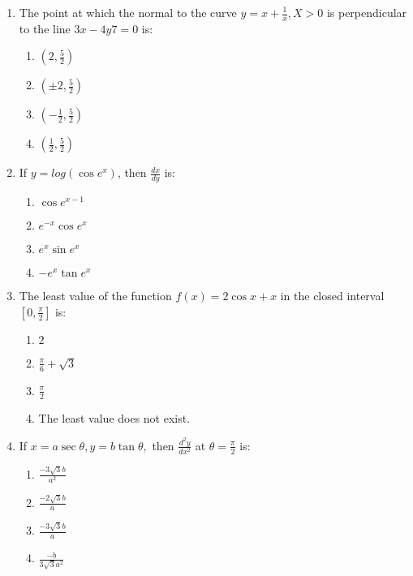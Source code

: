 \begin{enumerate}

\item The point at which the normal to the curve $ y = x + \frac{1}{x}, X > 0$ is perpendicular to the line $3x - 4y 7 = 0$ is:
	\begin{enumerate}
	\item $(2, \frac{5}{2})$
	\item $(\pm2, \frac{5}{2})$
      	\item $(-\frac{1}{2}, \frac{5}{2})$
      	\item $(\frac{1}{2}, \frac{5}{2})$
  	\end{enumerate}

\item If $y = log(\cos e^x)$, then $\frac{dx}{dy}$ is: 
   
	\begin{enumerate}
	\item $ \cos e^{x-1} $
	\item $ e^{-x} \cos e^x $
      	\item $ e^x \sin e^x $
      	\item $ -e^x \tan e^x $
  	\end{enumerate}

\item The least value of the function $ f(x) = 2\cos x + x $ in the closed interval $[0, \frac{\pi}{2}]$ is:

  	\begin{enumerate}
      	\item $ 2 $ 
      	\item $ \frac{\pi}{6} + \sqrt 3$
      	\item $ \frac{\pi}{2} $
	\item  The least value does not exist. 
  	\end{enumerate}

\item If $ x = a\sec \theta, y = b\tan \theta,$ then $ \frac{d^2y}{dx^2} $ at $ \theta = \frac{\pi}{2}$ is:
  
  	\begin{enumerate}
    	\item $ \frac{-3\sqrt 3b}{a^2} $
    	\item $ \frac{-2\sqrt 3b}{a} $
    	\item $ \frac{-3\sqrt 3b}{a} $
    	\item $ \frac{-b}{3 \sqrt 3a^2 }$
  	\end{enumerate}


\end{enumerate}
